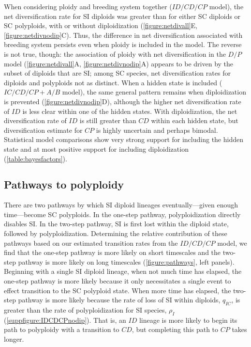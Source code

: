 When considering ploidy and breeding system together ($ID/CD/CP$ model), the net diversification rate for SI diploids was greater than for either SC diploids or SC polyploids, with or without diploidization (\cref{figure:netdivall}E, \cref{figure:netdivnodip}C).
Thus, the difference in net diversification associated with breeding system persists even when ploidy is included in the model.
The reverse is not true, though: the association of ploidy with net diversification in the $D/P$ model (\cref{figure:netdivall}A, \cref{figure:netdivnodip}A) appears to be driven by the subset of diploids that are SI; among SC species, net diversification rates for diploids and polyploids not as distinct.
%
When a hidden state is included ($IC/CD/CP+A/B$ model), the same general pattern remains when diploidization is prevented (\cref{figure:netdivnodip}D), although the higher net diversification rate of $ID$ is less clear within one of the hidden states.
With diploidization, the net diversification rate of $ID$ is still greater than $CD$ within each hidden state, but diversification estimate for $CP$ is highly uncertain and perhaps bimodal.
Statistical model comparisons show very strong support for including the hidden state and at most positive support for including diploidization (\cref{table:bayesfactors}).

\subsection{Pathways to polyploidy}

There are two pathways by which SI diploid lineages eventually---given enough time---become SC polyploids.
In the one-step pathway, polyploidization directly disables SI.
In the two-step pathway, SI is first lost within the diploid state, followed by polyploidization.
Determining the relative contribution of these pathways based on our estimated transition rates from the $ID/CD/CP$ model, we find that the one-step pathway is more likely on short timescales and the two-step pathway is more likely on long timescales (\cref{figure:pathways}, left panels).
Beginning with a single SI diploid lineage, when not much time has elapsed, the one-step pathway is more likely because it only necessitates a single event to effect transition to the SC polyploid state.
When more time has elapsed, the two-step pathway is more likely because the rate of loss of SI within diploids, $q_{IC}$, is greater than the rate of polyploidization for SI species, $\rho_I$ (\cref{suppfigure:IDCDCPnodip}).
That is, an $ID$ lineage is more likely to begin its path to polyploidy with a transition to $CD$, but completing this path to $CP$ takes longer.

